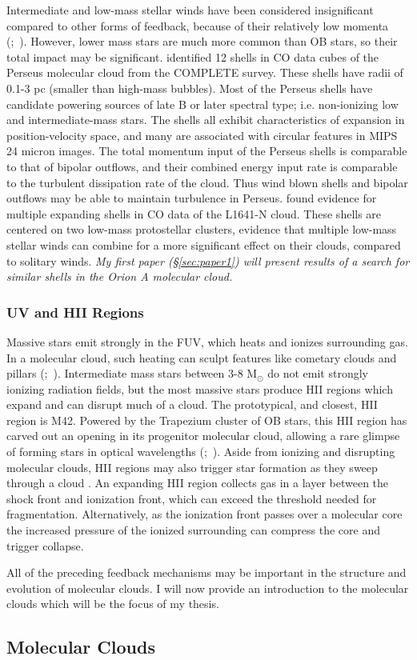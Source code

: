 Intermediate and low-mass stellar winds have been considered insignificant compared to other forms of feedback, because of their relatively low momenta (\citet{Vink01};~\citet{Smith14a}). However, lower mass stars are much more common than OB stars, so their total impact may be significant. \cite{Arce_2011} identified 12 shells in CO data cubes of the Perseus molecular cloud from the COMPLETE survey. These shells have radii of 0.1-3 pc (smaller than high-mass bubbles). Most of the Perseus shells have candidate powering sources of late B or later spectral type; i.e. non-ionizing low and intermediate-mass stars. The shells all exhibit characteristics of expansion in position-velocity space, and many are associated with circular features in MIPS 24 micron images. The total momentum input of the Perseus shells is comparable to that of bipolar outflows, and their combined energy input rate is comparable to the turbulent dissipation rate of the cloud. Thus wind blown shells and bipolar outflows may be able to maintain turbulence in Perseus. \cite{Nakamura12} found evidence for multiple expanding shells in CO data of the L1641-N cloud. These shells are centered on two low-mass protostellar clusters, evidence that multiple low-mass stellar winds can combine for a more significant effect on their clouds, compared to solitary winds. \textit{My first paper (\S\ref{sec:paper1}) will present results of a search for similar shells in the Orion A molecular cloud.}

\subsubsection{UV and HII Regions}\label{sec:uv}
Massive stars emit strongly in the FUV, which heats and ionizes surrounding gas. In a molecular cloud, such heating can sculpt features like cometary clouds and pillars (\citet{1983A&A...117..183R};~\citet{Walawender04}). Intermediate mass stars between 3-8 M$_\odot$ do not emit strongly ionizing radiation fields, but the most massive stars produce HII regions which expand and can disrupt much of a cloud. The prototypical, and closest, HII region is M42. Powered by the Trapezium cluster of OB stars, this HII region has carved out an opening in its progenitor molecular cloud, allowing a rare glimpse of forming stars in optical wavelengths (\citet{Odell93};~\citet{Ricci_2008}). Aside from ionizing and disrupting molecular clouds, HII regions may also trigger star formation as they sweep through a cloud \cite{Deharveng_2010}. An expanding HII region collects gas in a layer between the shock front and ionization front, which can exceed the threshold needed for fragmentation. Alternatively, as the ionization front passes over a molecular core the increased pressure of the ionized surrounding can compress the core and trigger collapse.

All of the preceding feedback mechanisms may be important in the structure and evolution of molecular clouds. I will now provide an introduction to the molecular clouds which will be the focus of my thesis.

\subsection{Molecular Clouds}\label{sec:clouds}




  